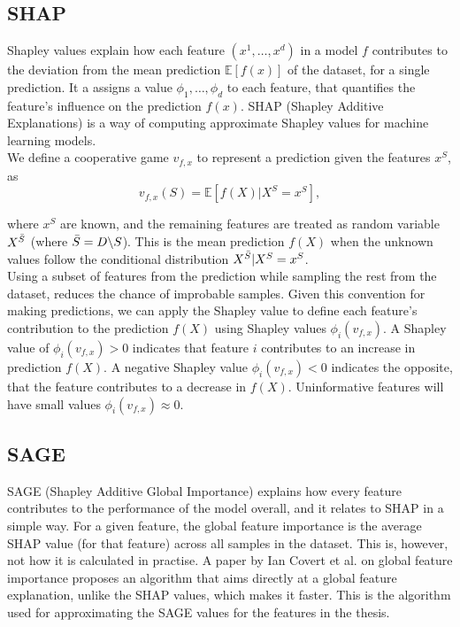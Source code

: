 \subsection{SHAP}
Shapley values explain how each feature $(x^1, \dots, x^d)$ in a model $f$ contributes to the deviation from the mean prediction $\mathbb{E}[f(x)]$ of the dataset, for a single prediction.
It a assigns a value $\phi_1, \dots, \phi_d$ to each feature, that quantifies the feature's influence on the prediction $f(x)$.
SHAP (Shapley Additive Explanations) is a way of computing approximate Shapley values for machine learning models.\\

We define a cooperative game $v_{f,x}$ to represent a prediction given the features $x^S$, as
\begin{equation}
    v_{f,x}(S) = \mathbb{E} \left[ f(X) | X^S = x^S \right],
\end{equation}

where $x^S$ are known, and the remaining features are treated as random variable $X^{\Bar{S}}$ (where $\Bar{S} = D \backslash S$).
This is the mean prediction $f(X)$ when the unknown values follow the conditional distribution $X^{\Bar{S}} | X^S = x^S$.\\

Using a subset of features from the prediction while sampling the rest from the dataset, reduces the chance of improbable samples.
Given this convention for making predictions, we can apply the Shapley value to define each feature's contribution to the prediction $f(X)$ using Shapley values $\phi_i(v_{f,x})$.
A Shapley value of $\phi_i(v_{f,x}) > 0$ indicates that feature $i$ contributes to an increase in prediction $f(X)$.
A negative Shapley value $\phi_i(v_{f,x}) < 0$ indicates the opposite, that the feature contributes to a decrease in $f(X)$.
Uninformative features will have small values $\phi_i(v_{f,x}) \approx 0$.

\subsection{SAGE}
SAGE (Shapley Additive Global Importance) explains how every feature contributes to the performance of the model overall, and it relates to SHAP in a simple way.
For a given feature, the global feature importance is the average SHAP value (for that feature) across all samples in the dataset.
This is, however, not how it is calculated in practise.
A paper by Ian Covert et al.
\cite{sage_paper} on global feature importance proposes an algorithm that aims directly at a global feature explanation, unlike the SHAP values, which makes
it faster.
This is the algorithm used for approximating the SAGE values for the features in the thesis.

